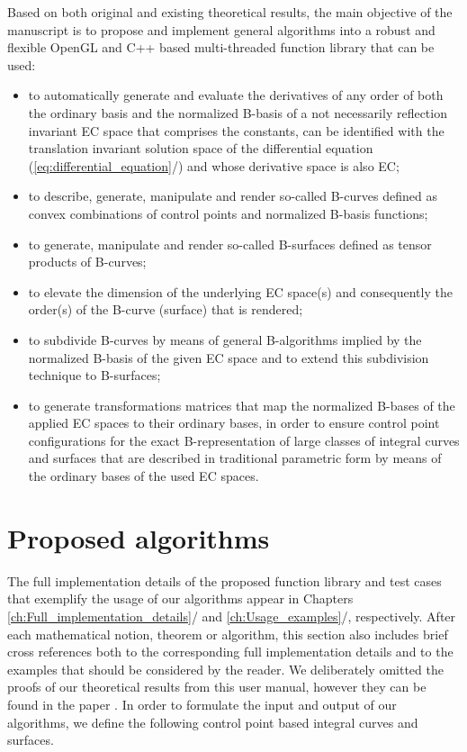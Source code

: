 \documentclass[b5paper, twosided]{book}
\DeclareRobustCommand{\mref}[1]{\ref{#1}{\relsize{-1}/\pageref{#1}}}
\begin{document}
Based on both original and existing theoretical results, the main objective of the manuscript is to propose and implement general algorithms into a robust and flexible OpenGL and C++ based multi-threaded function library that can be used: 
\begin{itemize}
    \item 
    to automatically generate and evaluate the derivatives of any order of both the ordinary basis and the normalized B-basis of a not necessarily reflection invariant EC space that comprises the constants, can be identified with the translation invariant solution space of the differential equation (\mref{eq:differential_equation}) and whose derivative space is also EC;
    
    \item
    to describe, generate, manipulate and render so-called B-curves defined as convex combinations of control points and normalized B-basis functions;
    
    \item
    to generate, manipulate and render so-called B-surfaces defined as tensor products of B-curves;
    
    \item
    to elevate the dimension of the underlying EC space(s) and consequently the order(s) of the B-curve (surface) that is rendered;
    
    \item
    to subdivide B-curves by means of general B-algorithms implied by the normalized B-basis of the given EC space and to extend this subdivision technique to B-surfaces;
    
    \item
    to generate transformations matrices that map the normalized B-bases of the applied EC spaces to their ordinary bases, in order to ensure control point configurations for the exact B-representation of large classes of integral curves and surfaces that are described in traditional parametric form by means of the ordinary bases of the used EC spaces.
\end{itemize}

\section{Proposed algorithms}\label{sec:proposed_algorithms}

The full implementation details of the proposed function library and test cases that exemplify the usage of our algorithms appear in Chapters \mref{ch:Full_implementation_details} and \mref{ch:Usage_examples}, respectively. After each mathematical notion, theorem or algorithm, this section also includes brief cross references both to the corresponding full implementation details and to the examples that should be considered by the reader. We deliberately omitted the proofs of our theoretical results from this user manual, however they can be found in the paper \citep{Roth2018a}. In order to formulate the input and output of our algorithms, we define the following control point based integral curves and surfaces.
\end{document}
